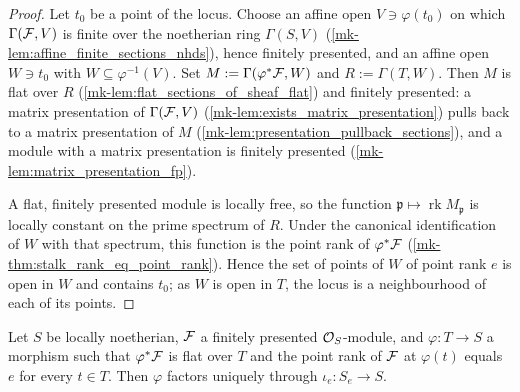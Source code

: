 \begin{proof}
  \leanok
  Let \(t_0\) be a point of the locus.  Choose an affine open
  \(V \ni \varphi(t_0)\) on which \(\Gamma(\mathcal{F}, V)\) is finite over the
  noetherian ring \(\Gamma(S, V)\)
  (\ref{mk-lem:affine_finite_sections_nhds}), hence finitely presented, and
  an affine open \(W \ni t_0\) with \(W \subseteq \varphi^{-1}(V)\).  Set
  \(M := \Gamma(\varphi^*\mathcal{F}, W)\) and \(R := \Gamma(T, W)\).  Then \(M\) is
  flat over \(R\) (\ref{mk-lem:flat_sections_of_sheaf_flat}) and finitely
  presented: a matrix presentation of \(\Gamma(\mathcal{F}, V)\)
  (\ref{mk-lem:exists_matrix_presentation}) pulls back to a matrix
  presentation of \(M\) (\ref{mk-lem:presentation_pullback_sections}), and a
  module with a matrix presentation is finitely presented
  (\ref{mk-lem:matrix_presentation_fp}).

  A flat, finitely presented module is locally free, so the function
  \(\mathfrak p \mapsto \operatorname{rk} M_{\mathfrak p}\) is locally
  constant on the prime spectrum of \(R\).  Under the canonical
  identification of \(W\) with that spectrum, this function is the point
  rank of \(\varphi^*\mathcal{F}\) (\ref{mk-thm:stalk_rank_eq_point_rank}).  Hence the
  set of points of \(W\) of point rank \(e\) is open in \(W\) and contains
  \(t_0\); as \(W\) is open in \(T\), the locus is a neighbourhood of each
  of its points.
\end{proof}

\begin{theorem}
  \label{mk-thm:factor_rank_stratum_unique}
  \leanok

  Let \(S\) be locally noetherian, \(\mathcal{F}\) a finitely presented
  \(\mathcal{O}_S\)-module, and \(\varphi : T \to S\) a morphism such that
  \(\varphi^*\mathcal{F}\) is flat over \(T\) and the point rank of \(\mathcal{F}\) at
  \(\varphi(t)\) equals \(e\) for every \(t \in T\).  Then \(\varphi\)
  factors uniquely through \(\iota_e : S_e \to S\).
\end{theorem}

